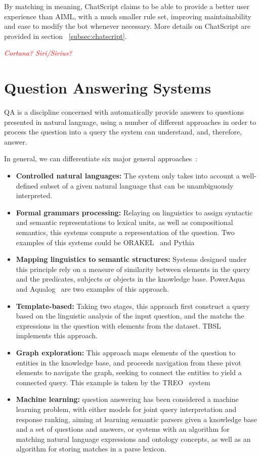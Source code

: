By matching in meaning, ChatScript claims to be able to provide a better user experience than \ac{AIML}, with a much smaller rule set, improving maintainability and ease to modify the bot whenever necessary. More details on ChatScript are provided in section ~\ref{subsec:chatscript}.

\emph{\textcolor{red}{Cortana? Siri/Sirius?}}

\section{Question Answering Systems}
\label{sec:qa_sys}

\ac{QA} is a discipline concerned with automatically provide answers to questions presented in natural language, using a number of different approaches in order to process the question into a query the system can understand, and, therefore, answer.

In general, we can differentiate six major general approaches~\cite{unger2014an}:

\begin{itemize}
  \item \textbf{Controlled natural languages:} The system only takes into account a well-defined subset of a given natural language that can be unambiguously interpreted.
  \item \textbf{Formal grammars processing:} Relaying on linguistics to assign syntactic and semantic representations to lexical units, as well as compositional semantics, this systems compute a representation of the question. Two examples of this systems could be ORAKEL~\cite{cimiano2008towards} and Pythia~\cite{unger2011pythia}
  \item \textbf{Mapping linguistics to semantic structures:} Systems designed under this principle rely on a measure of similarity between elements in the query and the predicates, subjects or objects in the knowledge base. PowerAqua~\cite{lopez2011poweraqua} and Aqualog~\cite{lopez2007aqualog} are two examples of this approach.
  \item \textbf{Template-based:} Taking two stages, this approach first construct a query based on the linguistic analysis of the input question, and the matchs the expressions in the question with elements from the dataset. TBSL~\cite{unger2012template} implements this approach.
  \item \textbf{Graph exploration:} This approach maps elements of the question to entities in the knowledge base, and proceeds navigation from these pivot elements to navigate the graph, seeking to connect the entities to yield a connected query. This example is taken by the TREO~\cite{freitas2011querying} system
  \item \textbf{Machine learning:} question answering has been considered a machine learning problem, with either models for joint query interpretation and response ranking, aiming at learning semantic parsers given a knowledge base and a set of questions and answers, or systems with an algorithm for matching natural language expressions and ontology concepts, as well as an algorithm for storing matches in a parse lexicon.
\end{itemize}

